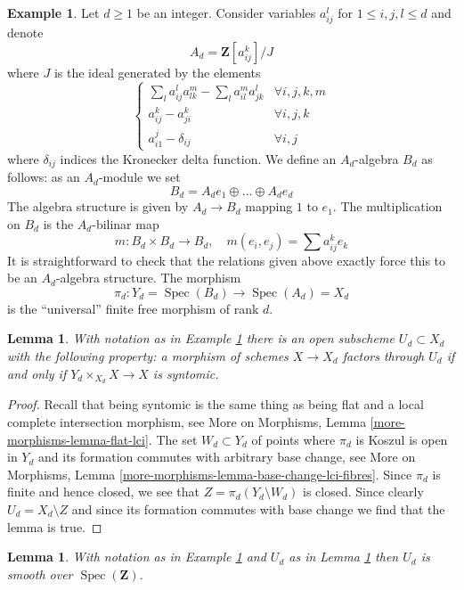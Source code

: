 \documentclass{stacks-project}
\theoremstyle{plain}
\newtheorem{lemma}[subsection]{Lemma}
\theoremstyle{definition}
\newtheorem{example}[subsection]{Example}
\theoremstyle{remark}
\numberwithin{equation}{subsection}
\def\Spec{\mathop{\mathrm{Spec}}}
\begin{document}
\begin{example}
\label{example-universal-finite-syntomic}
Let $d \geq 1$ be an integer. Consider variables
$a_{ij}^l$ for $1 \leq i, j, l \leq d$ and denote
$$
A_d = \mathbf{Z}[a_{ij}^k]/J
$$
where $J$ is the ideal generated by the elements
$$
\left\{
\begin{matrix}
\sum_l a_{ij}^la_{lk}^m - \sum_l a_{il}^ma_{jk}^l & \forall i, j, k, m \\
a_{ij}^k - a_{ji}^k & \forall i, j, k \\
a_{i1}^j - \delta_{ij} & \forall i, j
\end{matrix}
\right.
$$
where $\delta_{ij}$ indices the Kronecker delta function.
We define an $A_d$-algebra $B_d$ as follows: as an $A_d$-module we set
$$
B_d = A_d e_1 \oplus \ldots \oplus A_d e_d
$$
The algebra structure is given by $A_d \to B_d$ mapping $1$ to $e_1$.
The multiplication on $B_d$ is the $A_d$-bilinar map
$$
m : B_d \times B_d \longrightarrow B_d, \quad
m(e_i, e_j) = \sum a_{ij}^k e_k
$$
It is straightforward to check that the relations given above
exactly force this to be an $A_d$-algebra structure.
The morphism
$$
\pi_d : Y_d = \Spec(B_d) \longrightarrow \Spec(A_d) = X_d
$$
is the ``universal'' finite free morphism of rank $d$.
\end{example}

\begin{lemma}
\label{lemma-universal-finite-syntomic}
With notation as in Example \ref{example-universal-finite-syntomic}
there is an open subscheme $U_d \subset X_d$ with the following property:
a morphism of schemes $X \to X_d$ factors through $U_d$ if and only
if $Y_d \times_{X_d} X \to X$ is syntomic.
\end{lemma}

\begin{proof}
Recall that being syntomic is the same thing as being flat and
a local complete intersection morphism, see
More on Morphisms, Lemma \ref{more-morphisms-lemma-flat-lci}.
The set $W_d \subset Y_d$ of points where $\pi_d$ is Koszul
is open in $Y_d$ and its formation commutes with arbitrary base change, see
More on Morphisms, Lemma \ref{more-morphisms-lemma-base-change-lci-fibres}.
Since $\pi_d$ is finite and hence closed, we see that
$Z = \pi_d(Y_d \setminus W_d)$ is closed. Since clearly $U_d = X_d \setminus Z$
and since its formation commutes with base change we find that the lemma
is true.
\end{proof}

\begin{lemma}
\label{lemma-universal-finite-syntomic-smooth}
With notation as in Example \ref{example-universal-finite-syntomic}
and $U_d$ as in Lemma \ref{lemma-universal-finite-syntomic}
then $U_d$ is smooth over $\Spec(\mathbf{Z})$.
\end{lemma}
\end{document}

